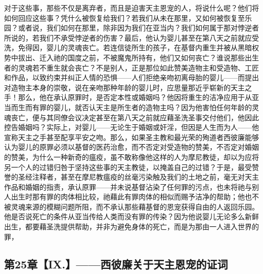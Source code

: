 对于这些事，那些不仅是离弃者，而且是迫害天主恩宠的人，将说什么呢？他们将如何回应这些事？凭什么被恢复给我们？若我们从未在那里，又如何被恢复至乐园？或者说，我们如何在那里，除非因为我们在亚当内？我们如何属于那对悖逆者所说的，若我们不承受悖逆者的伤害？最后，他认为婴儿甚至在第八天之前就应受洗，免得因，婴儿的灵魂丧亡。若连信徒所生的孩子，在基督内重生并被从黑暗权势中拔出、迁入祂的国度之前，不被魔鬼所持有，他们又如何丧亡？谁说那些出生者的灵魂若不重生就会丧亡？不是别人，正是那位如此赞美造物主和受造物、工匠和作品，以致约束并纠正人情的恐惧——人们拒绝亲吻初离母胎的婴儿——而提出对造物主本身的崇敬，说在亲吻那种年龄的婴儿时，应思量那近乎崭新的天主之手！那么，他在承认原罪时，是否定本性或婚姻吗？他因将重生的洁净应用于从亚当而生而有罪的婴儿，就否认天主是所生者的造物主吗？因为他害怕任何年龄的灵魂丧亡，便与其同僚会议决定甚至在第八天之前就应藉圣洗圣事交付他们，他因此控告婚姻吗？实际上，对婴儿——无论生于婚姻或奸淫，但因是人生而为人——他宣称天主之手甚至配享平安之吻。那么，如果圣主教和最光荣的殉道者西彼廉能够认为婴儿的原罪必须以基督的医药治愈，而不否定对受造物的赞美，不否定对婚姻的赞美，为什么一种新奇的瘟疫，虽不敢称像他这样的人为摩尼教徒，却以为应将另一个人的过错归咎于坚持这些事的天主教徒，以掩盖自己的过错？于是，最受赞誉的圣经注释者，甚至在摩尼教瘟疫的丝毫污染触及我们的土地之前，毫无对天主作品和婚姻的指责，承认原罪——并未说基督沾染了任何罪的污点，也未将祂与别人出生时那有罪的肉体相比较，祂藉此有罪肉体的相似而赐予洁净的帮助；他也不被灵魂来源的模糊问题所阻，而不承认那些藉基督的恩宠获得自由的人返回乐园。他是否说死亡的条件从亚当传给人类而没有罪的传染？因为他说婴儿无论多么新鲜出生，都要藉圣洗提供帮助，并非为避免身体的死亡，而是为那由一人进入世界的罪，\par


\subsection{第25章【IX.】——西彼廉关于天主恩宠的证词}

